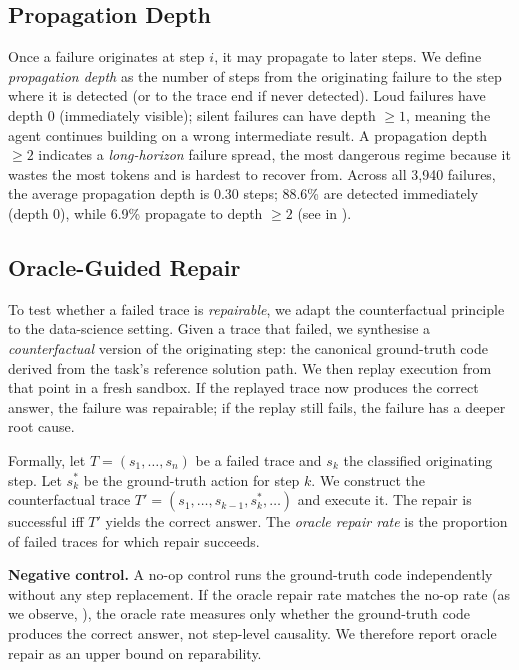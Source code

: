 \subsection{Propagation Depth}
\label{sec:propagation}

Once a failure originates at step $i$, it may propagate to later steps. We define \emph{propagation depth} as the number of steps from the originating failure to the step where it is detected (or to the trace end if never detected). Loud failures have depth 0 (immediately visible); silent failures can have depth $\geq 1$, meaning the agent continues building on a wrong intermediate result. A propagation depth $\geq 2$ indicates a \emph{long-horizon} failure spread, the most dangerous regime because it wastes the most tokens and is hardest to recover from. Across all 3{,}940 failures, the average propagation depth is 0.30 steps; 88.6\% are detected immediately (depth 0), while 6.9\% propagate to depth $\geq 2$ (see  in ).

\subsection{Oracle-Guided Repair}
\label{sec:causal}

To test whether a failed trace is \emph{repairable}, we adapt the counterfactual principle~\citep{shah2026causal} to the data-science setting. Given a trace that failed, we synthesise a \emph{counterfactual} version of the originating step: the canonical ground-truth code derived from the task's reference solution path. We then replay execution from that point in a fresh sandbox. If the replayed trace now produces the correct answer, the failure was repairable; if the replay still fails, the failure has a deeper root cause.

Formally, let $T = (s_1, \dots, s_n)$ be a failed trace and $s_k$ the classified originating step. Let $s_k^*$ be the ground-truth action for step $k$. We construct the counterfactual trace $T' = (s_1, \dots, s_{k-1}, s_k^*, \dots)$ and execute it. The repair is successful iff $T'$ yields the correct answer. The \emph{oracle repair rate} is the proportion of failed traces for which repair succeeds.

\textbf{Negative control.} A no-op control runs the ground-truth code independently without any step replacement. If the oracle repair rate matches the no-op rate (as we observe, ), the oracle rate measures only whether the ground-truth code produces the correct answer, not step-level causality. We therefore report oracle repair as an upper bound on reparability.

